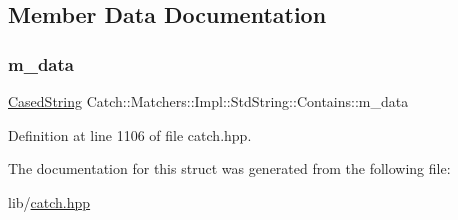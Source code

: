 \subsection{Member Data Documentation}
\hypertarget{struct_catch_1_1_matchers_1_1_impl_1_1_std_string_1_1_contains_a419a9ecaeaa417d4987982402e08b3eb}{}\label{struct_catch_1_1_matchers_1_1_impl_1_1_std_string_1_1_contains_a419a9ecaeaa417d4987982402e08b3eb} 
\subsubsection{\texorpdfstring{m\+\_\+data}{m\_data}}
{\footnotesize\ttfamily \hyperlink{struct_catch_1_1_matchers_1_1_impl_1_1_std_string_1_1_cased_string}{Cased\+String} Catch\+::\+Matchers\+::\+Impl\+::\+Std\+String\+::\+Contains\+::m\+\_\+data}



Definition at line 1106 of file catch.\+hpp.



The documentation for this struct was generated from the following file\+:\begin{DoxyCompactItemize}
\item 
lib/\hyperlink{catch_8hpp}{catch.\+hpp}\end{DoxyCompactItemize}
